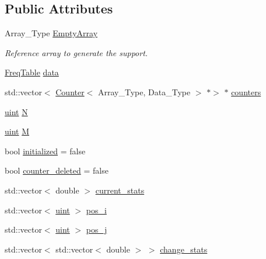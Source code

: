 \subsection*{Public Attributes}
\begin{DoxyCompactItemize}
\item 
Array\+\_\+\+Type \hyperlink{classbarry_1_1_support_ae26e46356041286028ffcc27195b9e8a}{Empty\+Array}
\begin{DoxyCompactList}\small\item\em Reference array to generate the support. \end{DoxyCompactList}\item 
\hyperlink{classbarry_1_1_freq_table}{Freq\+Table} \hyperlink{classbarry_1_1_support_afae160c07727e72f36fcf5a16828ed21}{data}
\item 
std\+::vector$<$ \hyperlink{classbarry_1_1_counter}{Counter}$<$ Array\+\_\+\+Type, Data\+\_\+\+Type $>$ $\ast$$>$ $\ast$ \hyperlink{classbarry_1_1_support_ab7cd458219742709c0a214d7bf70b7d9}{counters}
\item 
\hyperlink{namespacebarry_a11dfc53ddb4672278319aa04f1e09a6c}{uint} \hyperlink{classbarry_1_1_support_a1e3158ceae716505cb0c5fb14374be9b}{N}
\item 
\hyperlink{namespacebarry_a11dfc53ddb4672278319aa04f1e09a6c}{uint} \hyperlink{classbarry_1_1_support_aaceb2f83d235c70034e089087991cff8}{M}
\item 
bool \hyperlink{classbarry_1_1_support_a737bc10d6a6e4e3b18aeef0228bd45bb}{initialized} = false
\item 
bool \hyperlink{classbarry_1_1_support_a96c18c68794e756bc84ee2405dca505a}{counter\+\_\+deleted} = false
\item 
std\+::vector$<$ double $>$ \hyperlink{classbarry_1_1_support_a094f0851c7d6bfa7876eb0df2be4439e}{current\+\_\+stats}
\item 
std\+::vector$<$ \hyperlink{namespacebarry_a11dfc53ddb4672278319aa04f1e09a6c}{uint} $>$ \hyperlink{classbarry_1_1_support_ac6012c953dd04c2e74c2105b193f50ac}{pos\+\_\+i}
\item 
std\+::vector$<$ \hyperlink{namespacebarry_a11dfc53ddb4672278319aa04f1e09a6c}{uint} $>$ \hyperlink{classbarry_1_1_support_a5aeba4c4447efe7523abfb1cef864e63}{pos\+\_\+j}
\item 
std\+::vector$<$ std\+::vector$<$ double $>$ $>$ \hyperlink{classbarry_1_1_support_a09cebbb8953514f77e2f70d447d3ff2a}{change\+\_\+stats}
\end{DoxyCompactItemize}



